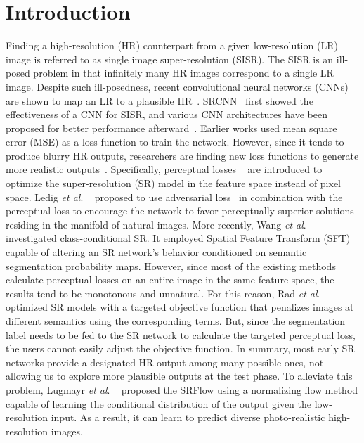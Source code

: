 \documentclass{article}
\newcommand{\etal}{\textit{et al}. }
\begin{document}
\section{Introduction}
Finding a high-resolution (HR) counterpart from a given low-resolution (LR) image is referred to as single image super-resolution (SISR). The SISR is an ill-posed problem in that infinitely many HR images correspond to a single LR image. Despite such ill-posedness, recent convolutional neural networks (CNNs) are shown to map an LR to a plausible HR~\cite{yang2019deep}.
SRCNN~\cite{dong2014learning, dong2015image} first showed the effectiveness of a CNN for SISR, and various CNN architectures have been proposed for better performance afterward~\cite{kim2016accurate, kim2016deeply, shi2016real, tai2017memnet, lim2017enhanced, zhang2018image, zhang2018residual, yang2018drfn, jin2019flexible, zhang2019single, he2019mrfn, zhang2020accurate, tian2020coarse}. Earlier works used mean square error (MSE) as a loss function to train the network. However, since it tends to produce blurry HR outputs, researchers are finding new loss functions to generate more realistic outputs~\cite{928e476715544027af08ec20936dd6ca, dosovitskiy2016generating}. Specifically, perceptual losses ~\cite{johnson2016perceptual} are introduced to optimize the super-resolution (SR) model in the feature space instead of pixel space. Ledig \etal~\cite{2017photo} proposed to use adversarial loss~\cite{goodfellow2014generative} in combination with the perceptual loss to encourage the network to favor perceptually superior solutions residing in the manifold of natural images.
More recently, Wang \etal~\cite{2018recovering} investigated class-conditional SR. It employed Spatial Feature Transform (SFT) capable of altering an SR network's behavior conditioned on semantic segmentation probability maps. However, since most of the existing methods calculate perceptual losses on an entire image in the same feature space, the results tend to be monotonous and unnatural. For this reason, Rad \etal~\cite{rad2019srobb} optimized SR models with a targeted objective function that penalizes images at different semantics using the corresponding terms. But, since the segmentation label needs to be fed to the SR network to calculate the targeted perceptual loss, the users cannot easily adjust the objective function. In summary, most early SR networks provide a designated HR output among many possible ones, not allowing us to explore more plausible outputs at the test phase. To alleviate this problem, Lugmayr \etal ~\cite{2020srflow} proposed the SRFlow using a normalizing flow method capable of learning the conditional distribution of the output given the low-resolution input. As a result, it can learn to predict diverse photo-realistic high-resolution images.
\end{document}
